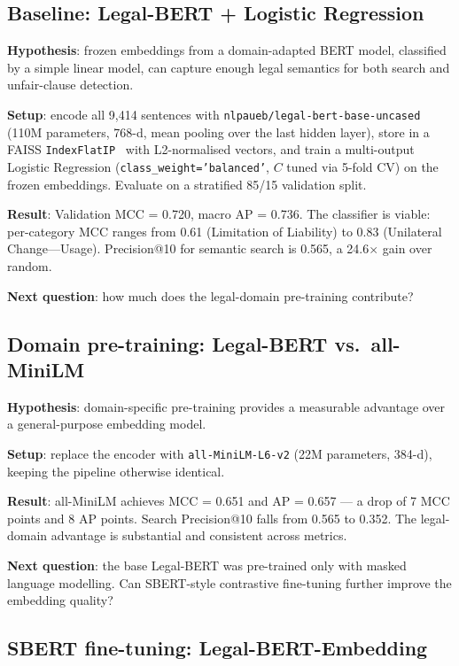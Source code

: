 \documentclass[11pt,a4paper]{article}
\begin{document}
\subsection{Baseline: Legal-BERT + Logistic Regression}

\textbf{Hypothesis}: frozen embeddings from a domain-adapted BERT model,
classified by a simple linear model, can capture enough legal semantics
for both search and unfair-clause detection.

\textbf{Setup}: encode all 9,414 sentences with
\texttt{nlpaueb/legal-bert-base-uncased}~\cite{chalkidis2020legalbert}
(110M parameters, 768-d, mean pooling over the last hidden layer), store
in a FAISS \texttt{IndexFlatIP}~\cite{johnson2019faiss} with L2-normalised
vectors, and train a multi-output Logistic Regression
(\texttt{class\_weight='balanced'}, $C$ tuned via 5-fold CV) on the
frozen embeddings.  Evaluate on a stratified 85/15 validation split.

\textbf{Result}: Validation MCC = 0.720, macro AP = 0.736.  The classifier
is viable: per-category MCC ranges from 0.61 (Limitation of Liability) to
0.83 (Unilateral Change---Usage).  Precision@10 for semantic search is
0.565, a 24.6$\times$ gain over random.

\textbf{Next question}: how much does the legal-domain pre-training
contribute?

\subsection{Domain pre-training: Legal-BERT vs.\ all-MiniLM}

\textbf{Hypothesis}: domain-specific pre-training provides a measurable
advantage over a general-purpose embedding model.

\textbf{Setup}: replace the encoder with
\texttt{all-MiniLM-L6-v2} (22M parameters, 384-d), keeping the
pipeline otherwise identical.

\textbf{Result}: all-MiniLM achieves MCC = 0.651 and AP = 0.657 --- a drop
of 7 MCC points and 8 AP points.  Search Precision@10 falls from 0.565 to
0.352.  The legal-domain advantage is substantial and consistent across
metrics.

\textbf{Next question}: the base Legal-BERT was pre-trained only with
masked language modelling.  Can SBERT-style contrastive fine-tuning
further improve the embedding quality?

\subsection{SBERT fine-tuning: Legal-BERT-Embedding}
\end{document}
